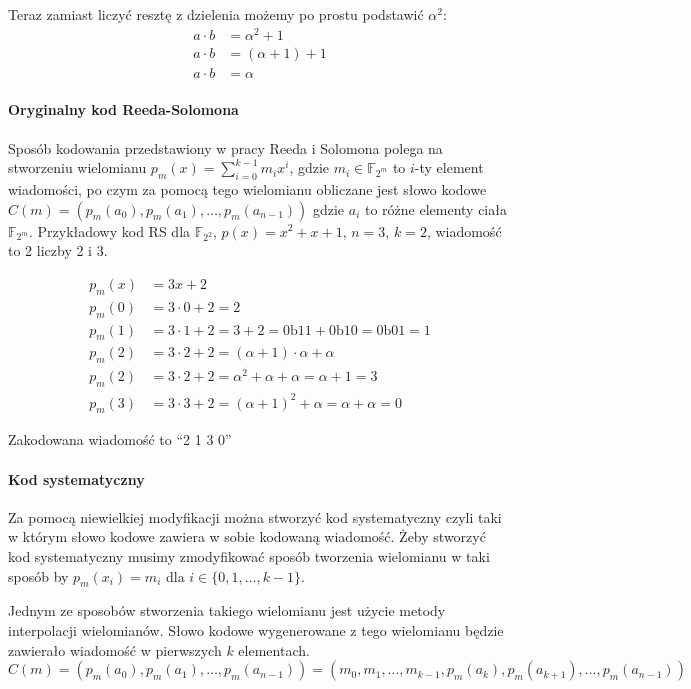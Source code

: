 Teraz zamiast liczyć resztę z dzielenia możemy po prostu podstawić $\alpha^2$:
\begin{align*}
    a \cdot b &= \alpha^2 + 1 \\
    a \cdot b &= (\alpha + 1) + 1 \\
    a \cdot b &= \alpha
\end{align*}

\paragraph{Oryginalny kod Reeda-Solomona}
Sposób kodowania przedstawiony w pracy Reeda i Solomona polega na stworzeniu wielomianu $p_m(x)=\sum_{i=0}^{k-1}m_{i}x^i$, gdzie $m_i\in\mathbb{F}_{2^m}$
to $i$\nobreakdash-ty element wiadomości, po czym za pomocą tego wielomianu
obliczane jest słowo kodowe $C(m)=(p_m(a_0), p_m(a_1), \ldots, p_m(a_{n-1}))$
gdzie $a_i$ to różne elementy ciała $\mathbb{F}_{2^m}$.
\newline
Przykładowy kod RS dla $\mathbb{F}_{2^2}$, $p(x) = x^2 + x + 1$, $n=3$,
$k=2$, wiadomość to 2 liczby 2 i 3.

\begin{align*}
    p_m(x) &= 3x + 2 \\
    p_m(0) &= 3 \cdot 0 + 2 = 2 \\
    p_m(1) &= 3 \cdot 1 + 2 = 3 + 2 = 0\text{b}11 + 0\text{b}10 = 0\text{b}01 = 1 \\
    p_m(2) &= 3 \cdot 2 + 2 = (\alpha + 1) \cdot \alpha + \alpha \\
    p_m(2) &= 3 \cdot 2 + 2 = \alpha^2 + \alpha + \alpha = \alpha + 1 = 3 \\
    p_m(3) &= 3 \cdot 3 + 2 = (\alpha + 1)^2 + \alpha = \alpha + \alpha = 0
\end{align*}

Zakodowana wiadomość to ``2 1 3 0''

\paragraph{Kod systematyczny}

Za pomocą niewielkiej modyfikacji można stworzyć kod systematyczny czyli taki w którym słowo kodowe zawiera w sobie kodowaną wiadomość.
Żeby stworzyć kod systematyczny musimy zmodyfikować sposób tworzenia wielomianu w taki sposób by $p_m(x_i)=m_i$ dla $i \in \{0,1,\ldots,k-1\}$.

Jednym ze sposobów stworzenia takiego wielomianu jest użycie metody interpolacji wielomianów. Słowo kodowe wygenerowane z tego wielomianu będzie zawierało wiadomość w pierwszych $k$ elementach.
\[C(m)=(p_m(a_0), p_m(a_1), \ldots, p_m(a_{n-1}))=(m_0, m_1, \ldots, m_{k-1}, p_m(a_k), p_m(a_{k+1}), \ldots, p_m(a_{n-1}))\]

